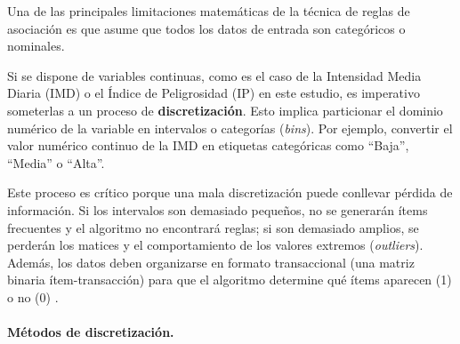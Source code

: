 \documentclass[twoside,a4paper,12pt,onecolumn,openany]{book}
\begin{document}
Una de las principales limitaciones matemáticas de la técnica de reglas de asociación es que asume que todos los datos de entrada son categóricos o nominales. 

\vspace{0.5cm}

Si se dispone de variables continuas, como es el caso de la Intensidad Media Diaria (IMD) o el Índice de Peligrosidad (IP) en este estudio, es imperativo someterlas a un proceso de \textbf{discretización}. Esto implica particionar el dominio numérico de la variable en intervalos o categorías (\textit{bins}). Por ejemplo, convertir el valor numérico continuo de la IMD en etiquetas categóricas como ``Baja'', ``Media'' o ``Alta''.

\vspace{0.5cm}

Este proceso es crítico porque una mala discretización puede conllevar pérdida de información. Si los intervalos son demasiado pequeños, no se generarán ítems frecuentes y el algoritmo no encontrará reglas; si son demasiado amplios, se perderán los matices y el comportamiento de los valores extremos (\textit{outliers}). Además, los datos deben organizarse en formato transaccional (una matriz binaria ítem-transacción) para que el algoritmo determine qué ítems aparecen (1) o no (0) \cite{apuntes_teoria2025}.

\paragraph{Métodos de discretización.} 

\vspace{0.5cm}
\end{document}

